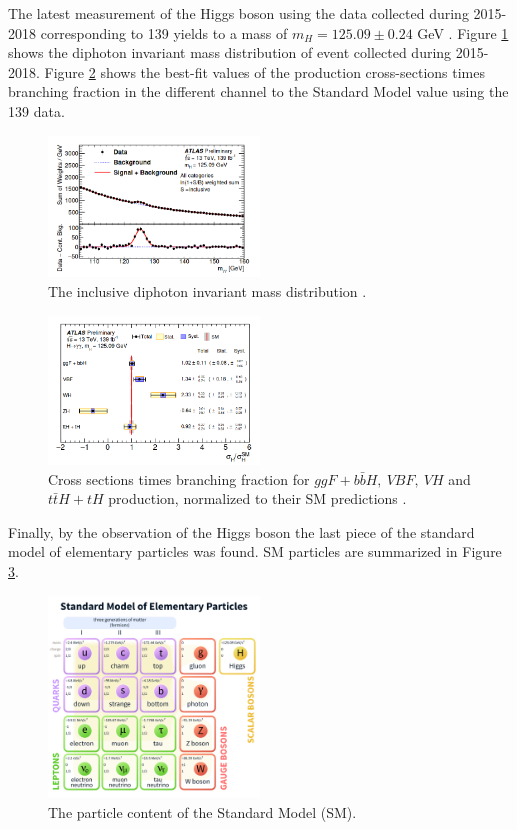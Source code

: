 The latest measurement of the Higgs boson using the data collected during 2015-2018 corresponding to 139 \ifb yields to a mass of $m_{H}=125.09\pm0.24 $ GeV \cite{Mass}. Figure \ref{fig:chap1:H2012:MyyRun2} shows the diphoton invariant mass distribution of event collected during 2015-2018. Figure \ref{fig:chap1:H2012:HXsecRun2} shows the best-fit values of the production cross-sections times branching fraction in the different channel to the Standard Model value using the 139 \ifb data.\\
\begin{figure}[htbp]
    \centering
    \includegraphics[width=0.5\textwidth]{Ch1/Img/myy_run2.png}
    \caption{The inclusive diphoton invariant mass distribution \cite{ATLAS_2020}.}
    \label{fig:chap1:H2012:MyyRun2}
\end{figure}
\begin{figure}[htbp]
    \centering
    \includegraphics[width=0.5\textwidth]{Ch1/Img/HXsecRun2.png}
    \caption{Cross sections times branching fraction for $ggF+b\bar{b}H , \ VBF, \ VH$ and $t\bar{t}H + tH$ production, normalized to their SM predictions \cite{ATLAS_2020}.}
    \label{fig:chap1:H2012:HXsecRun2}
\end{figure}
Finally, by the observation of the Higgs boson the last piece of the standard model of elementary particles was found. SM particles are summarized in Figure \ref{fig:chap1:H2012:SM}. \\
\begin{figure}[htbp]
    \centering
    \includegraphics[width=0.5\textwidth]{Ch1/Img/SM_particles.png}
    \caption{The particle content of the Standard Model (SM).}
    \label{fig:chap1:H2012:SM}
\end{figure}

